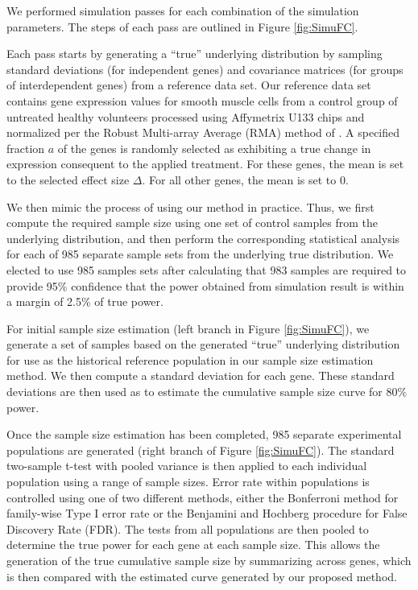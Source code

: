 \documentclass[12pt]{article}
\begin{document}
We performed simulation passes for each combination of the
simulation parameters.  The steps of each pass are outlined in
Figure \ref{fig:SimuFC}.

Each pass starts by generating a ``true'' underlying distribution
by sampling standard deviations (for independent genes) and
covariance matrices (for groups of interdependent genes) from a
reference data set.  Our reference data set contains gene
expression values for smooth muscle cells from a control group of
untreated healthy volunteers processed using Affymetrix U133 chips
and normalized per the Robust Multi-array Average (RMA) method of
\citet{Irizarry03}.  A specified fraction $a$ of the
genes is randomly selected as exhibiting a true change in
expression consequent to the applied treatment. For these genes,
the mean is set to the selected effect size $\Delta$.  For all
other genes, the mean is set to $0$.

We then mimic the process of using our method in practice. Thus, we
first compute the required sample size using one set of control
samples from the underlying distribution, and then perform the
corresponding statistical analysis for each of 985 separate sample
sets from the underlying true distribution.  We elected to use 985
samples sets after calculating that 983 samples are required to
provide 95\% confidence that the power obtained from simulation
result is within a margin of 2.5\% of true power.

For initial sample size estimation (left branch in Figure
\ref{fig:SimuFC}), we generate a set of samples based on the
generated ``true'' underlying distribution for use as the historical
reference population in our sample size estimation method.  We then
compute a standard deviation for each gene. These standard
deviations are then used as to estimate the cumulative sample size
curve for 80\% power.

Once the sample size estimation has been completed, 985 separate
experimental populations are generated (right branch of Figure
\ref{fig:SimuFC}).  The standard two-sample t-test with pooled
variance is then applied to each individual population using a range
of sample sizes.  Error rate within populations is controlled using
one of two different methods, either the Bonferroni method for
family-wise Type I error rate or the Benjamini and Hochberg
procedure \citeyearpar{Benjamini95} for False Discovery Rate (FDR).
The tests from all populations are then pooled to determine the true
power for each gene at each sample size. This allows the generation
of the true cumulative sample size by summarizing across genes,
which is then compared with the estimated curve generated by our
proposed method.
\end{document}
